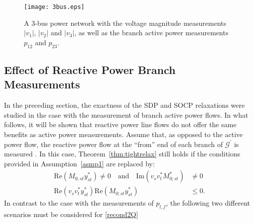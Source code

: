 \documentclass[journal,twoside]{IEEEtran}
\newcommand{\cG}{{\mathcal G}}
\begin{document}
\begin{figure}[t]
\centering
\texttt{[image: 3bus.eps]}
\caption{A 3-bus power network with the voltage magnitude measurements $|v_1|$, $|v_2|$ and $|v_3|$,
as well as the branch active power measurements $p_{12}$ and $p_{23}$.}
\label{fig:3bus}
\vspace{-0.4cm}
\end{figure}

\vspace{-2mm}

\subsection{Effect of Reactive Power Branch Measurements}

In the preceding section, the exactness of the SDP and SOCP relaxations were studied in the case with the measurement of branch active power flows. In what follows, it will be shown that reactive power line flows do not offer the same benefits as active power measurements.  Assume that, as opposed to the active power flow, the reactive  power flow at the ``from'' end of each branch of $\cG^{\prime}$ is measured .
In this case, Theorem~\ref{thm:tightrelax} still holds if the conditions provided in Assumption~\ref{asmp1} are replaced by:
\begin{subequations}
\begin{align}
	\mathrm{Re}(M_{0;st}y^{\ast}_{st})\neq 0 \quad \mathrm{and} \quad
	\mathrm{Im}(v_sv^{\ast}_t M^{\ast}_{0;st}) &\neq 0 \\
	\mathrm{Re}(v_sv^{\ast}_t y^{\ast}_{st})\mathrm{Re}(M_{0;st}y^{\ast}_{st}) & \leq 0. \label{recond2Q}
\end{align}
\end{subequations}
In contrast to the case with the measurements of $p_{l,f}$, the following two different scenarios must be considered for \eqref{recond2Q}
\end{document}
